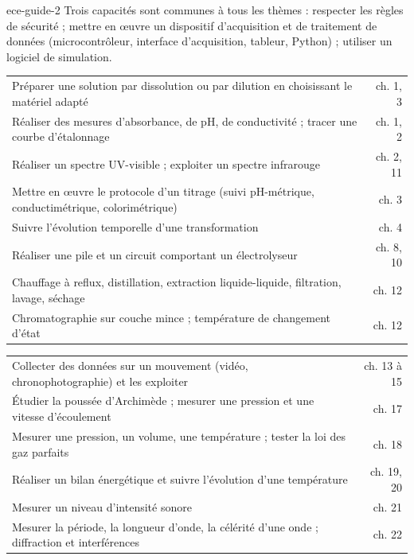 \begin{blocEdition}{ece-guide-2}
\fontsize{10}{13.5}\selectfont
Trois capacités sont communes à tous les thèmes : respecter les règles de sécurité ; mettre en œuvre un dispositif
d'acquisition et de traitement de données (microcontrôleur, interface d'acquisition, tableur, Python) ; utiliser un
logiciel de simulation.
\begin{tabularx}{\linewidth}{@{}Yr@{}}\toprule
Préparer une solution par dissolution ou par dilution en choisissant le matériel adapté & ch. 1, 3 \\
Réaliser des mesures d'absorbance, de pH, de conductivité ; tracer une courbe d'étalonnage & ch. 1, 2 \\
Réaliser un spectre UV-visible ; exploiter un spectre infrarouge & ch. 2, 11 \\
Mettre en œuvre le protocole d'un titrage (suivi pH-métrique, conductimétrique, colorimétrique) & ch. 3 \\
Suivre l'évolution temporelle d'une transformation & ch. 4 \\
Réaliser une pile et un circuit comportant un électrolyseur & ch. 8, 10 \\
Chauffage à reflux, distillation, extraction liquide-liquide, filtration, lavage, séchage & ch. 12 \\
Chromatographie sur couche mince ; température de changement d'état & ch. 12 \\\bottomrule
\end{tabularx}
\begin{tabularx}{\linewidth}{@{}Yr@{}}\toprule
Collecter des données sur un mouvement (vidéo, chronophotographie) et les exploiter & ch. 13 à 15 \\
Étudier la poussée d'Archimède ; mesurer une pression et une vitesse d'écoulement & ch. 17 \\
Mesurer une pression, un volume, une température ; tester la loi des gaz parfaits & ch. 18 \\
Réaliser un bilan énergétique et suivre l'évolution d'une température & ch. 19, 20 \\
Mesurer un niveau d'intensité sonore & ch. 21 \\
Mesurer la période, la longueur d'onde, la célérité d'une onde ; diffraction et interférences & ch. 22 \\

\end{tabularx}
\end{blocEdition}
